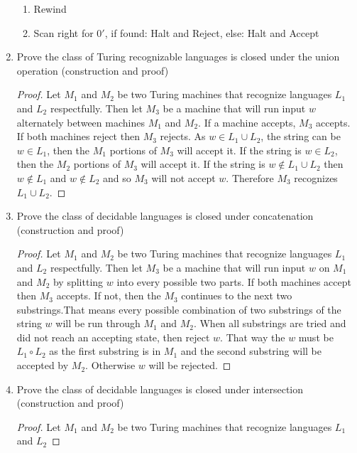 \documentclass{article}
\begin{document}
\begin{enumerate}
\begin{enumerate}[label=(\arabic*)]
            \item Rewind
            \item Scan right for $0'$, if found: Halt and Reject, else: Halt and Accept
        \end{enumerate}
        \item Prove the class of Turing recognizable languages is closed under the union operation 
        (construction and proof)
        \begin{proof}
            Let $M_1$ and $M_2$ be two Turing machines that recognize languages $L_1$ and $L_2$
            respectfully. Then let $M_3$ be a machine that will run input $w$ alternately between 
            machines $M_1$ and $M_2$. If a machine accepts, $M_3$ accepts. If both 
            machines reject then $M_3$ rejects. As $w\in L_1\cup L_2$, the string can be $w\in L_1$,
            then the $M_1$ portions of $M_3$ will accept it. If the string is $w\in L_2$, then the
            $M_2$ portions of $M_3$ will accept it. If the string is $w\not\in L_1\cup L_2$ then 
            $w\not\in L_1$ and $w\not\in L_2$ and so $M_3$ will not accept $w$. Therefore $M_3$ 
            recognizes $L_1\cup L_2$.
        \end{proof}
        \item Prove the class of decidable languages is closed under concatenation (construction 
        and proof)
        \begin{proof}
            Let $M_1$ and $M_2$ be two Turing machines that recognize languages $L_1$ and $L_2$
            respectfully. Then let $M_3$ be a machine that will run input $w$ on $M_1$ and $M_2$
            by splitting $w$ into every possible two parts. If both machines accept then $M_3$ 
            accepts. If not, then the $M_3$ continues to the next two substrings.That means every 
            possible combination of two substrings of the string $w$ will be run through $M_1$ 
            and $M_2$. When all substrings are tried and did not reach an accepting state, then 
            reject $w$. That way the $w$ must be $L_1\circ L_2$ as the first substring is in 
            $M_1$ and the second substring will be accepted by $M_2$. Otherwise $w$ will be rejected.
        \end{proof}
        \item Prove the class of decidable languages is closed under intersection (construction 
        and proof)
        \begin{proof}
            Let $M_1$ and $M_2$ be two Turing machines that recognize languages $L_1$ and $L_2$

\end{proof}
\end{enumerate}
\end{document}
